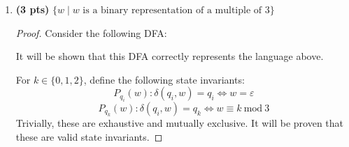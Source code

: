 \documentclass[11pt]{article}
\begin{document}
\begin{enumerate}[label=\textbf{Q\arabic*.}]
\begin{enumerate}[label=\textit{\alph*)}]
\begin{proof}
		\medskip

		\textbf{Base Case.} Let \(w = \varepsilon\). Both \(\delta (q_0, \varepsilon) = q_0\) and \(\varepsilon \in \Sigma ^*\) are true, so \(P_{q_0}(\varepsilon)\) is true.

		\medskip

		\textbf{Induction Hypothesis.} Let \(q \in \mathcal{Q}\), \(w \in \Sigma ^*\), and \(\sigma \in \Sigma\). Since \(\mathcal{Q} = \{q_0\}\), \(q = q_0\). Suppose that \(P_{q_0}(w)\) is true.

		\medskip

		\textbf{Induction Step.} For all \(\sigma\), \(\delta (q_0, \sigma) = q_0\). It is obvious that \(wz \in \Sigma ^*\), so \(P_{q_0}(wz)\) holds true.
		
		Thus the state invariants are correct.

		Now, let \(w \in \Sigma ^*\). Then by the state invariant, \(\delta (q_0, w) = q_0\), which is an accepting state, so \(w\) is accepted.

		A string that is not in \(\Sigma ^*\) cannot be found so the backwards direction is vacuously true.

		Therefore \(\mathcal{D}\) is correct.
		\smallbreak
	\end{proof}
	\item \textbf{(3 pts)} $ \{w \mid w \text{ is a binary representation of a multiple of 3}\} $
	
	\begin{proof}
		Consider the following DFA:

		\begin{center}
		\end{center}

		It will be shown that this DFA correctly represents the language above.

		For \(k \in \{0, 1, 2\}\), define the following state invariants:
		\[
			P_{q_i}(w) : \delta (q_i, w) = q_i \iff w = \varepsilon
		\]
		\[
			P_{q_k}(w) : \delta (q_i, w) = q_k \iff w \equiv k \ \mathrm{mod}\ 3
		\]
		Trivially, these are exhaustive and mutually exclusive. It will be proven that these are valid state invariants.


\end{proof}
\end{enumerate}
\end{enumerate}
\end{document}
